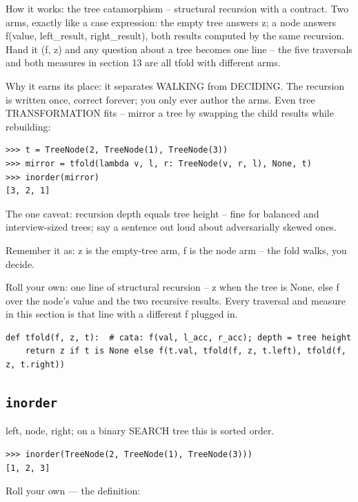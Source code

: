 \documentclass[10pt,letterpaper]{book}
\begin{document}
How it works: the tree catamorphism -- structural recursion with a contract. Two arms, exactly like a case expression: the empty tree answers z; a node answers f(value, left\_result, right\_result), both results computed by the same recursion. Hand it (f, z) and any question about a tree becomes one line -- the five traversals and both measures in section 13 are all tfold with different arms.


Why it earns its place: it separates WALKING from DECIDING. The recursion is written once, correct forever; you only ever author the arms. Even tree TRANSFORMATION fits -- mirror a tree by swapping the child results while rebuilding:

\begin{lstlisting}[style=ex]
>>> t = TreeNode(2, TreeNode(1), TreeNode(3))
>>> mirror = tfold(lambda v, l, r: TreeNode(v, r, l), None, t)
>>> inorder(mirror)
[3, 2, 1]
\end{lstlisting}

The one caveat: recursion depth equals tree height -- fine for balanced and interview-sized trees; say a sentence out loud about adversarially skewed ones.


Remember it as: z is the empty-tree arm, f is the node arm -- the fold walks, you decide.


Roll your own: one line of structural recursion -- z when the tree is None, else f over the node's value and the two recursive results. Every traversal and measure in this section is that line with a different f plugged in.

\begin{lstlisting}[style=ex]
def tfold(f, z, t):  # cata: f(val, l_acc, r_acc); depth = tree height
    return z if t is None else f(t.val, tfold(f, z, t.left), tfold(f, z, t.right))
\end{lstlisting}

\subsection{\texttt{inorder}}\label{def:inorder}
left, node, right; on a binary SEARCH tree this is sorted order.
\begin{lstlisting}[style=ex]
>>> inorder(TreeNode(2, TreeNode(1), TreeNode(3)))
[1, 2, 3]
\end{lstlisting}

Roll your own --- the definition:
\end{document}
